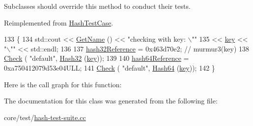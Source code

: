 Subclasses should override this method to conduct their tests. 

Reimplemented from \hyperlink{classHashTestCase_a4fe6e6b9431c983ed52fd472e9f0d3b4}{Hash\+Test\+Case}.


\begin{DoxyCode}
133 \{
134   std::cout << \hyperlink{classns3_1_1TestCase_a28f7bb59669c24dae1c290fc17fc9b62}{GetName} () << \textcolor{stringliteral}{"checking with key: \(\backslash\)""}
135             << \hyperlink{classHashTestCase_a955e1a4f01ad2ae6474e52e3bd403069}{key} << \textcolor{stringliteral}{"\(\backslash\)""} << std::endl;
136 
137   \hyperlink{classHashTestCase_ae09d132ca1bd82e42b9beedbf98f9b45}{hash32Reference} = 0x463d70e2;  \textcolor{comment}{// murmur3(key)}
138   \hyperlink{classHashTestCase_a798edd071714c5f3ff76a087622e097c}{Check} ( \textcolor{stringliteral}{"default"}, \hyperlink{group__hash_ga7245e12aa78a81c7d008dd8fba67aeb4}{Hash32} (\hyperlink{classHashTestCase_a955e1a4f01ad2ae6474e52e3bd403069}{key}));
139 
140   \hyperlink{classHashTestCase_a5e302abe033e775847dcf8856a94fea2}{hash64Reference} = 0xa750412079d53e04ULL;
141   \hyperlink{classHashTestCase_a798edd071714c5f3ff76a087622e097c}{Check} ( \textcolor{stringliteral}{"default"}, \hyperlink{group__hash_ga32813ece904f0d68bba1999f8752143a}{Hash64} (\hyperlink{classHashTestCase_a955e1a4f01ad2ae6474e52e3bd403069}{key}));
142 \}
\end{DoxyCode}


Here is the call graph for this function\+:




The documentation for this class was generated from the following file\+:\begin{DoxyCompactItemize}
\item 
core/test/\hyperlink{hash-test-suite_8cc}{hash-\/test-\/suite.\+cc}\end{DoxyCompactItemize}
